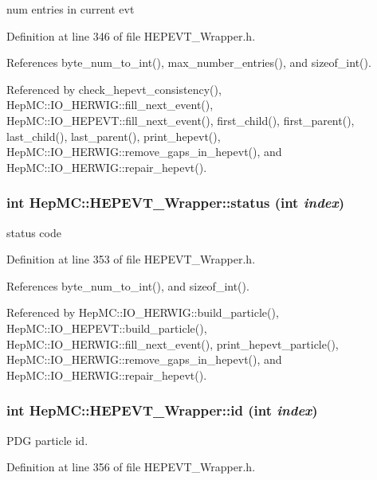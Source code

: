 num entries in current evt 



Definition at line 346 of file HEPEVT\_\-Wrapper.h.

References byte\_\-num\_\-to\_\-int(), max\_\-number\_\-entries(), and sizeof\_\-int().

Referenced by check\_\-hepevt\_\-consistency(), Hep\-MC::IO\_\-HERWIG::fill\_\-next\_\-event(), Hep\-MC::IO\_\-HEPEVT::fill\_\-next\_\-event(), first\_\-child(), first\_\-parent(), last\_\-child(), last\_\-parent(), print\_\-hepevt(), Hep\-MC::IO\_\-HERWIG::remove\_\-gaps\_\-in\_\-hepevt(), and Hep\-MC::IO\_\-HERWIG::repair\_\-hepevt().
\subsubsection{\setlength{\rightskip}{0pt plus 5cm}int Hep\-MC::HEPEVT\_\-Wrapper::status (int {\em index})\hspace{0.3cm}{\tt  [inline, static]}}\label{classHepMC_1_1HEPEVT__Wrapper_f9397a180035031ac93cd6501efdc86f}


status code 



Definition at line 353 of file HEPEVT\_\-Wrapper.h.

References byte\_\-num\_\-to\_\-int(), and sizeof\_\-int().

Referenced by Hep\-MC::IO\_\-HERWIG::build\_\-particle(), Hep\-MC::IO\_\-HEPEVT::build\_\-particle(), Hep\-MC::IO\_\-HERWIG::fill\_\-next\_\-event(), print\_\-hepevt\_\-particle(), Hep\-MC::IO\_\-HERWIG::remove\_\-gaps\_\-in\_\-hepevt(), and Hep\-MC::IO\_\-HERWIG::repair\_\-hepevt().
\subsubsection{\setlength{\rightskip}{0pt plus 5cm}int Hep\-MC::HEPEVT\_\-Wrapper::id (int {\em index})\hspace{0.3cm}{\tt  [inline, static]}}\label{classHepMC_1_1HEPEVT__Wrapper_dab25a5f58694ea47c1a51ea56e4b42f}


PDG particle id. 



Definition at line 356 of file HEPEVT\_\-Wrapper.h.

